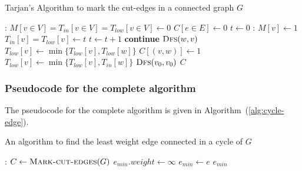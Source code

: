 \documentclass[12pt]{report}
\begin{document}
    \begin{algorithm}
        \caption{Tarjan's Algorithm to mark the cut-edges in a connected graph $G$}
        \label{alg:cut-edges}
        \begin{algorithmic}[1]
            :
                \State $M[v \in V] = T_{in}[v \in V] = T_{low}[v \in V] \gets 0$
                \State $C[e \in E] \gets 0$
                \State $t \gets 0$
                :
                    \State $M[v] \gets 1$
                    \State $T_{in}[v] = T_{low}[v] \gets t$
                    \State $t \gets t + 1$
                            \State \textbf{continue}
                            \State $\Call{Dfs}{w, v}$
                            \State $T_{low}[v] \gets \min{\{T_{low}[v], T_{low}[w]\}}$
                                \State $C[(v, w)] \gets 1$
                            \EndIf
                        \Else
                            \State $T_{low}[v] \gets \min{\{T_{low}[v], T_{in}[w]\}}$
                        \EndIf
                    \EndFor
                \EndProcedure
                \State $\Call{Dfs}{v_{0}, v_{0}}$ 
                \State \Return $C$
            \EndProcedure
        \end{algorithmic}
    \end{algorithm}

    \subsubsection*{Pseudocode for the complete algorithm}
    The pseudocode for the complete algorithm is given in Algorithm~(\ref{alg:cycle-edge}).

    \begin{algorithm}
        \caption{An algorithm to find the least weight edge connected in a cycle of $G$}
        \label{alg:cycle-edge}
        \begin{algorithmic}[1]
            :
                \State $C \gets \Call{Mark-cut-edges}{G}$
                \State $e_{min}.weight \gets \infty$
                            \State $e_{min} \gets e$
                        \EndIf
                    \EndIf
                \EndFor
                \State \Return $e_{min}$
            \EndProcedure
        \end{algorithmic}
    \end{algorithm}
\end{document}
